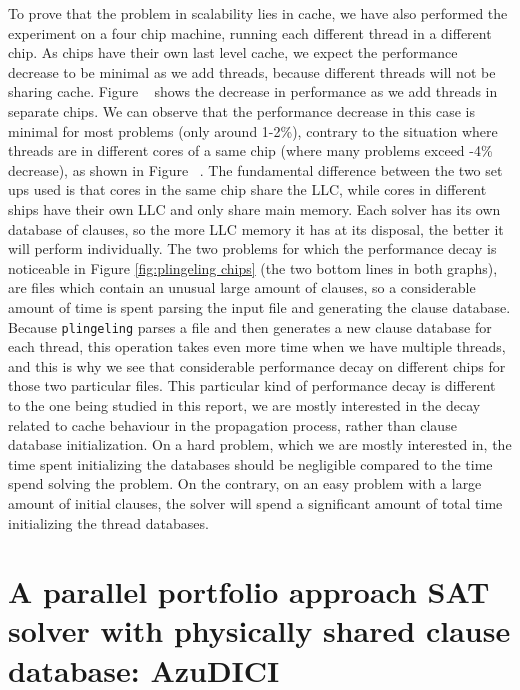 \documentclass[12pt]{diicc}
\begin{document}
To prove that the problem in scalability lies in cache, we have also performed the experiment on a four chip machine, running each different thread in a different chip. As chips have their own last level cache, we expect the performance decrease to be minimal as we add threads, because different threads will not be sharing cache. Figure ~ shows the decrease in performance as we add threads in separate chips. We can observe that the performance decrease in this case is minimal for most problems (only around 1-2\%), contrary to the situation where threads are in different cores of a same chip (where many problems exceed -4\% decrease), as shown in Figure ~. The fundamental difference between the two set ups used is that cores in the same chip share the LLC, while cores in different ships have their own LLC and only share main memory. Each solver has its own database of clauses, so the more LLC memory it has at its disposal, the better it will perform individually. The two problems for which the performance decay is noticeable in Figure \ref{fig:plingeling chips} (the two bottom lines in both graphs), are files which contain an unusual large amount of clauses, so a considerable amount of time is spent parsing the input file and generating the clause database. Because \texttt{plingeling} parses a file and then generates a new clause database for each thread, this operation takes even more time when we have multiple threads, and this is why we see that considerable performance decay on different chips for those two particular files. This particular kind of performance decay is different to the one being studied in this report, we are mostly interested in the decay related to cache behaviour in the propagation process, rather than clause database initialization. On a hard problem, which we are mostly interested in, the time spent initializing the databases should be negligible compared to the time spend solving the problem. On the contrary, on an easy problem with a large amount of initial clauses, the solver will spend a significant amount of total time initializing the thread databases. 


\section{A parallel portfolio approach SAT solver with physically shared clause database: AzuDICI}
\end{document}
